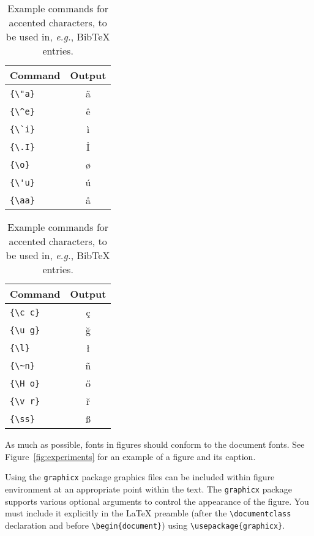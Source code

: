 \documentclass[11pt]{article}
\begin{document}
\begin{table}
  \centering
  \begin{tabular}{lc}
    \hline
    \textbf{Command} & \textbf{Output} \\
    \hline
    \verb|{\"a}|     & {\"a}           \\
    \verb|{\^e}|     & {\^e}           \\
    \verb|{\`i}|     & {\`i}           \\
    \verb|{\.I}|     & {\.I}           \\
    \verb|{\o}|      & {\o}            \\
    \verb|{\'u}|     & {\'u}           \\
    \verb|{\aa}|     & {\aa}           \\\hline
  \end{tabular}
  \begin{tabular}{lc}
    \hline
    \textbf{Command} & \textbf{Output} \\
    \hline
    \verb|{\c c}|    & {\c c}          \\
    \verb|{\u g}|    & {\u g}          \\
    \verb|{\l}|      & {\l}            \\
    \verb|{\~n}|     & {\~n}           \\
    \verb|{\H o}|    & {\H o}          \\
    \verb|{\v r}|    & {\v r}          \\
    \verb|{\ss}|     & {\ss}           \\
    \hline
  \end{tabular}
  \caption{Example commands for accented characters, to be used in, \emph{e.g.}, Bib\TeX{} entries.}
  \label{tab:accents}
\end{table}

As much as possible, fonts in figures should conform
to the document fonts. See Figure~\ref{fig:experiments} for an example of a figure and its caption.

Using the \verb|graphicx| package graphics files can be included within figure
environment at an appropriate point within the text.
The \verb|graphicx| package supports various optional arguments to control the
appearance of the figure.
You must include it explicitly in the \LaTeX{} preamble (after the
\verb|\documentclass| declaration and before \verb|\begin{document}|) using
\verb|\usepackage{graphicx}|.

\end{document}
